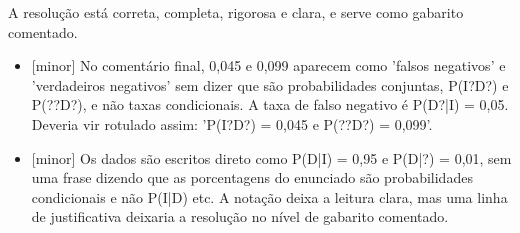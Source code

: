 \documentclass{article}%
\begin{document}
A resolução está correta, completa, rigorosa e clara, e serve como gabarito comentado.%
\begin{itemize}%
\item%
{[}minor{]} No comentário final, 0,045 e 0,099 aparecem como 'falsos negativos' e 'verdadeiros negativos' sem dizer que são probabilidades conjuntas, P(I?D?) e P(??D?), e não taxas condicionais. A taxa de falso negativo é P(D?|I) = 0,05. Deveria vir rotulado assim: 'P(I?D?) = 0,045 e P(??D?) = 0,099'.%
\item%
{[}minor{]} Os dados são escritos direto como P(D|I) = 0,95 e P(D|?) = 0,01, sem uma frase dizendo que as porcentagens do enunciado são probabilidades condicionais e não P(I|D) etc. A notação deixa a leitura clara, mas uma linha de justificativa deixaria a resolução no nível de gabarito comentado.%
\end{itemize}%
\end{document}
